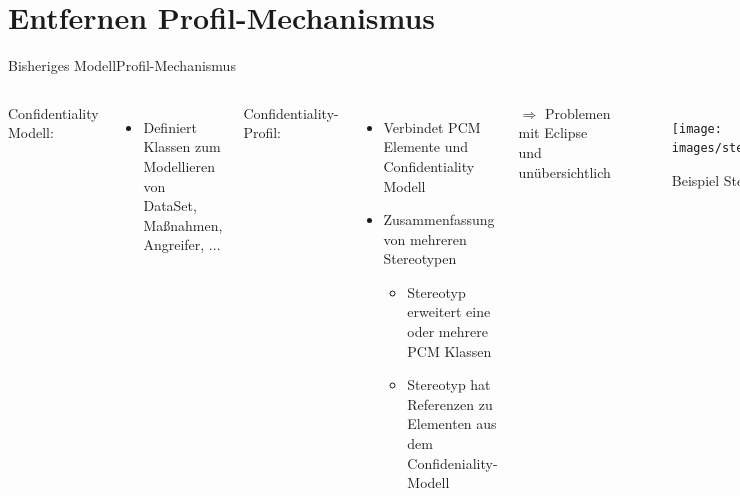 \documentclass{sdqbeamer}
\begin{document}
\section{Entfernen Profil-Mechanismus}
\begin{frame}{Bisheriges Modell}{Profil-Mechanismus}
\begin{columns}
Confidentiality Modell: 
\begin{itemize}
	\item Definiert Klassen zum Modellieren von DataSet, Maßnahmen, Angreifer, ...
\end{itemize}
\vspace{0.05\textheight}
Confidentiality-Profil:
\begin{itemize}
	\item Verbindet PCM Elemente und Confidentiality Modell
	\item Zusammenfassung von mehreren Stereotypen
	\begin{itemize}
		\item Stereotyp erweitert eine oder mehrere PCM Klassen
		\item Stereotyp hat Referenzen zu Elementen aus dem Confideniality-Modell
	\end{itemize}
	
\end{itemize}%
$\Rightarrow$ Problemen mit Eclipse und unübersichtlich
\centering
\begin{figure}
\texttt{[image: images/stereotype.pdf]}
		\caption{Beispiel Stereotyp}
\end{figure}
\end{columns}
\end{frame}	
\end{document}
